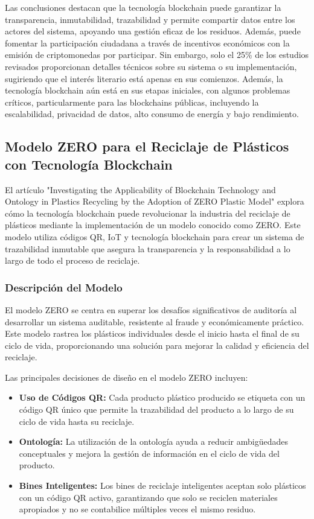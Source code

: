 \documentclass[main.tex]{subfiles}
\begin{document}
Las conclusiones destacan que la tecnología blockchain puede garantizar la transparencia, inmutabilidad, trazabilidad y permite compartir datos entre los actores del sistema, apoyando una gestión eficaz de los residuos. Además, puede fomentar la participación ciudadana a través de incentivos económicos con la emisión de criptomonedas por participar. Sin embargo, solo el 25\% de los estudios revisados proporcionan detalles técnicos sobre su sistema o su implementación, sugiriendo que el interés literario está apenas en sus comienzos. Además, la tecnología blockchain aún está en sus etapas iniciales, con algunos problemas críticos, particularmente para las blockchains públicas, incluyendo la escalabilidad, privacidad de datos, alto consumo de energía y bajo rendimiento.

\subsection{Modelo ZERO para el Reciclaje de Plásticos con Tecnología Blockchain}
El artículo "Investigating the Applicability of Blockchain Technology and Ontology in Plastics Recycling by the Adoption of ZERO Plastic Model" \cite{sandhiya2020investigating} explora cómo la tecnología blockchain puede revolucionar la industria del reciclaje de plásticos mediante la implementación de un modelo conocido como ZERO. Este modelo utiliza códigos QR, IoT y tecnología blockchain para crear un sistema de trazabilidad inmutable que asegura la transparencia y la responsabilidad a lo largo de todo el proceso de reciclaje.

\subsubsection{Descripción del Modelo}
El modelo ZERO se centra en superar los desafíos significativos de auditoría al desarrollar un sistema auditable, resistente al fraude y económicamente práctico. Este modelo rastrea los plásticos individuales desde el inicio hasta el final de su ciclo de vida, proporcionando una solución para mejorar la calidad y eficiencia del reciclaje.

Las principales decisiones de diseño en el modelo ZERO incluyen:
\begin{itemize}
    \item \textbf{Uso de Códigos QR:} Cada producto plástico producido se etiqueta con un código QR único que permite la trazabilidad del producto a lo largo de su ciclo de vida hasta su reciclaje.
    \item \textbf{Ontología:} La utilización de la ontología ayuda a reducir ambigüedades conceptuales y mejora la gestión de información en el ciclo de vida del producto.
    \item \textbf{Bines Inteligentes:} Los bines de reciclaje inteligentes aceptan solo plásticos con un código QR activo, garantizando que solo se reciclen materiales apropiados y no se contabilice múltiples veces el mismo residuo.
\end{itemize}
\end{document}

